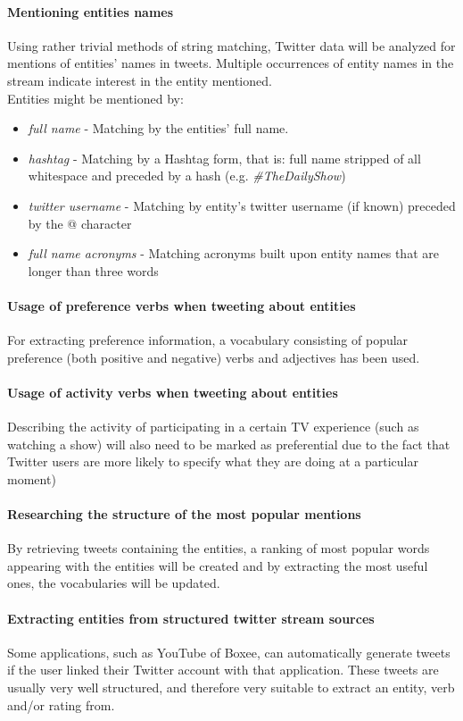 \paragraph{Mentioning entities names}
Using rather trivial methods of string matching, Twitter data will be analyzed for
mentions of entities' names in tweets. Multiple occurrences of entity names in the
stream indicate interest in the entity mentioned. \\
Entities might be mentioned by:
\begin{itemize}
  \item \textit{full name} - Matching by the entities' full name.
  \item \textit{hashtag} - Matching by a Hashtag form, that is: full name stripped of all whitespace and preceded by a hash (e.g. \textit{\#TheDailyShow})
  \item \textit{twitter username} - Matching by entity's twitter username (if known) preceded by the @ character
  \item \textit{full name acronyms} - Matching acronyms built upon entity names that are longer than three words
\end{itemize}
\paragraph{Usage of preference verbs when tweeting about entities}
For extracting preference information, a vocabulary consisting of
popular preference (both positive and negative) verbs and adjectives has been used.
\paragraph{Usage of activity verbs when tweeting about entities}
Describing the activity of participating in a certain TV experience (such
as watching a show) will also need to be marked as preferential due to the
fact that Twitter users are more likely to specify what they are doing at a
particular moment)
\paragraph{Researching the structure of the most popular mentions}
By retrieving tweets containing the entities, a ranking of most popular words
appearing with the entities will be created and by extracting the most useful
ones, the vocabularies will be updated.
\paragraph{Extracting entities from structured twitter stream sources}
Some applications, such as YouTube of Boxee, can automatically generate tweets
if the user linked their Twitter account with that application. These tweets are
usually very well structured, and therefore very suitable to extract an entity, verb and/or rating from.
